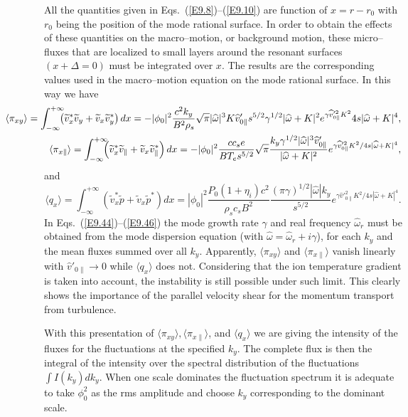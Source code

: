 \documentclass[a4paper,openany,12pt]{book}
\begin{document}
{All the quantities given in Eqs.~(\ref{E9.8})--(\ref{E9.10}) are function of $x=r-r_0$ with $r_0$ being the position of the mode rational surface. In order to obtain the effects of these quantities on the macro--motion, or background motion, these micro--fluxes that are localized to small layers around the resonant surfaces $(x+\Delta= 0)$ must be integrated over $x$. The results are the corresponding values used in the macro--motion equation on the mode rational surface. In this way we have
\begin{eqnarray}
&&\hspace*{-.7in}\langle\pi_{xy}\rangle=\int_{-\infty}^{+\infty}\!\!\!\!\left(\widetilde v_x^*\widetilde v_y+\widetilde v_x\widetilde v_y^*\right)dx=-|\phi_0|^2\frac{c^2k_y}{B^2\rho_s}{\sqrt\pi|\widehat\omega|^3K\widehat v'_{0\|}{s^{5/2}\gamma^{1/2}|\widehat\omega+K|^2} e^{\gamma\widehat v'^2_{0\|}K^2}4s|\widehat\omega+K|^4},\label{E9.44}\\
&&\hspace*{-.7in}\langle\pi_{x\|}\rangle=\int_{-\infty}^{+\infty}\!\!\!\!\left(\widetilde v_x^*\widetilde v_\|+\widetilde v_x\widetilde v^*_\|\right)dx = -|\phi_0|^2
\frac{cc_se}{BT_e s^{5/2}}\sqrt\pi\frac{k_y\gamma^{1/2}|\widehat\omega|^3\widehat v'_{0\|}}{|\widehat\omega+K|^2} e^{\gamma\widehat v'^2_{0\|}K^2/4s|\widehat\omega+K|^4},\label{E9.45}
\end{eqnarray}
and
\begin{equation}
\langle q_x\rangle=\int_{-\infty}^{+\infty}\left(\widetilde v^*_x\widetilde p+\widetilde v_x\widetilde p^*\right)dx=|\phi_0|^2\frac{P_0(1+\eta_i)c^2}{\rho_s c_s B^2}
\frac{(\pi\gamma)^{1/2}|\widehat\omega|k_y}{s^{5/2}}e^{\gamma\widehat v'^2_{0\|} K^2/4s|\widehat\omega+K|^4}.\label{E9.46}
\end{equation}
In Eqs.~(\ref{E9.44})--(\ref{E9.46}) the mode growth rate $\gamma$ and real frequency $\widehat\omega_r$ must be obtained from the mode dispersion equation (with $\widehat\omega=\widehat\omega_r+i\gamma$), for each $k_y$ and the mean fluxes summed over all $k_y$. Apparently, $\langle\pi_{xy}\rangle$ and $\langle\pi_{x\|}\rangle$ vanish linearly with $\widehat v'_{0\|}\to 0$ while 
$\langle q_x\rangle$ does not. Considering that the ion temperature gradient is taken into account, the instability is still possible under such limit. This clearly shows the importance of the parallel velocity shear for the momentum transport from turbulence.

With this presentation of $\langle\pi_{xy}\rangle, \langle\pi_{x\|}\rangle$, and 
$\langle q_x\rangle$ we are giving the intensity of the fluxes for the fluctuations at the specified $k_y$. The complete flux is then the integral of the intensity over the spectral distribution of the fluctuations $\int I(k_y)dk_y$. When one scale dominates the fluctuation spectrum it is adequate to take $\phi_0^2$ as the rms amplitude and choose $k_y$ corresponding to the dominant scale.

}
\end{document}
